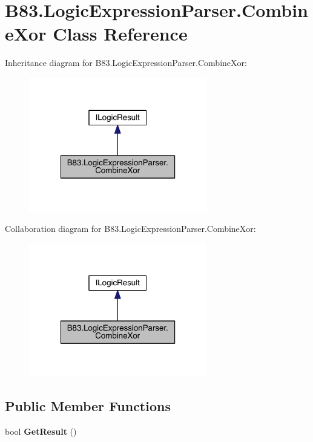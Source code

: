 \hypertarget{class_b83_1_1_logic_expression_parser_1_1_combine_xor}{}\section{B83.\+Logic\+Expression\+Parser.\+Combine\+Xor Class Reference}
\label{class_b83_1_1_logic_expression_parser_1_1_combine_xor}


Inheritance diagram for B83.\+Logic\+Expression\+Parser.\+Combine\+Xor\+:\nopagebreak
\begin{figure}[H]
\begin{center}
\leavevmode
\includegraphics[width=220pt]{class_b83_1_1_logic_expression_parser_1_1_combine_xor__inherit__graph}
\end{center}
\end{figure}


Collaboration diagram for B83.\+Logic\+Expression\+Parser.\+Combine\+Xor\+:\nopagebreak
\begin{figure}[H]
\begin{center}
\leavevmode
\includegraphics[width=220pt]{class_b83_1_1_logic_expression_parser_1_1_combine_xor__coll__graph}
\end{center}
\end{figure}
\subsection*{Public Member Functions}
\begin{DoxyCompactItemize}
\item 
bool {\bfseries Get\+Result} ()\hypertarget{class_b83_1_1_logic_expression_parser_1_1_combine_xor_a1b621ac78c2edcecf005dfe371eb1651}{}\label{class_b83_1_1_logic_expression_parser_1_1_combine_xor_a1b621ac78c2edcecf005dfe371eb1651}

\end{DoxyCompactItemize}
